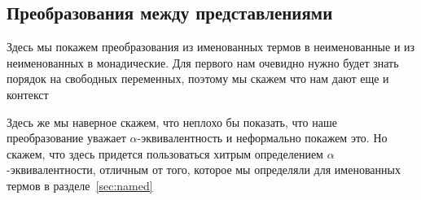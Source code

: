 \subsection{Преобразования между представлениями}

Здесь мы покажем преобразования из именованных термов в неименованные и из неименованных в монадические. Для первого нам очевидно нужно будет знать порядок на свободных переменных, поэтому мы скажем что нам дают еще и контекст

Здесь же мы наверное скажем, что неплохо бы показать, что наше преобразование уважает $\alpha$-эквивалентность и неформально покажем это. Но скажем, что здесь придется пользоваться хитрым определением $\alpha$-эквивалентности, отличным от того, которое мы определяли для именованных термов в разделе~\ref{sec:named}
